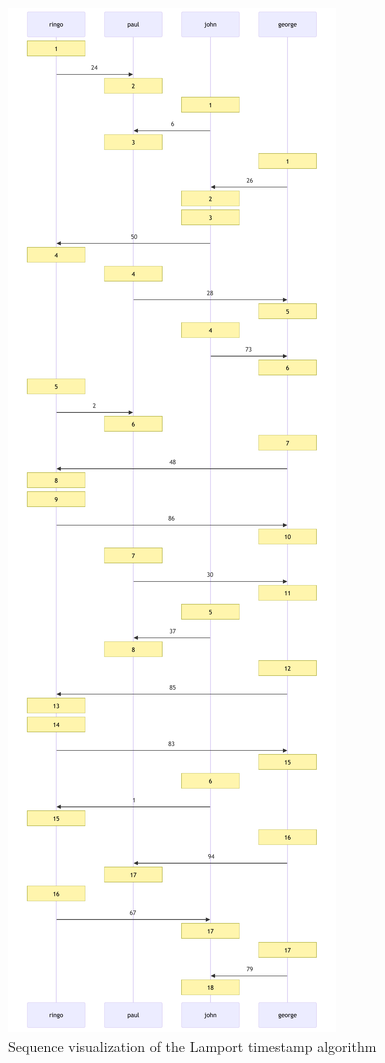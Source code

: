 \documentclass[a4paper, 11pt]{article}
\begin{document}
\begin{figure}[H]
  \begin{center}
    \includegraphics[height=0.985\textheight]{graphics/mermaid_lamport.pdf}
    \caption{Sequence visualization of the Lamport timestamp algorithm}
    \label{fig:seq1}
  \end{center}
\end{figure}
\end{document}
